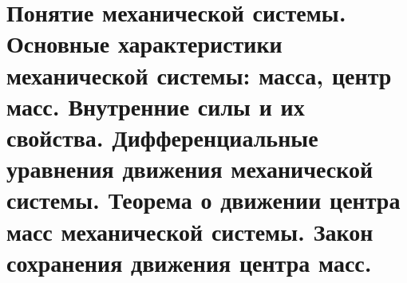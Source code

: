 \chapter{Понятие механической системы. Основные характеристики механической
системы: масса, центр масс. Внутренние силы и их свойства. Дифференциальные
уравнения движения механической системы. Теорема о движении центра масс
механической системы. Закон сохранения движения центра масс.}

\newpage
